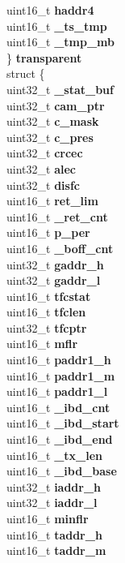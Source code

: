 \begin{DoxyCompactItemize}
\begin{tabbing}
\>\>uint16\_t {\bfseries haddr4}\\
\>\>uint16\_t {\bfseries \_ts\_tmp}\\
\>\>uint16\_t {\bfseries \_tmp\_mb}\\
\>\} {\bfseries transparent}\\
\>struct \{\\
\>\>uint32\_t {\bfseries \_stat\_buf}\\
\>\>uint32\_t {\bfseries cam\_ptr}\\
\>\>uint32\_t {\bfseries c\_mask}\\
\>\>uint32\_t {\bfseries c\_pres}\\
\>\>uint32\_t {\bfseries crcec}\\
\>\>uint32\_t {\bfseries alec}\\
\>\>uint32\_t {\bfseries disfc}\\
\>\>uint16\_t {\bfseries ret\_lim}\\
\>\>uint16\_t {\bfseries \_ret\_cnt}\\
\>\>uint16\_t {\bfseries p\_per}\\
\>\>uint16\_t {\bfseries \_boff\_cnt}\\
\>\>uint32\_t {\bfseries gaddr\_h}\\
\>\>uint32\_t {\bfseries gaddr\_l}\\
\>\>uint16\_t {\bfseries tfcstat}\\
\>\>uint16\_t {\bfseries tfclen}\\
\>\>uint32\_t {\bfseries tfcptr}\\
\>\>uint16\_t {\bfseries mflr}\\
\>\>uint16\_t {\bfseries paddr1\_h}\\
\>\>uint16\_t {\bfseries paddr1\_m}\\
\>\>uint16\_t {\bfseries paddr1\_l}\\
\>\>uint16\_t {\bfseries \_ibd\_cnt}\\
\>\>uint16\_t {\bfseries \_ibd\_start}\\
\>\>uint16\_t {\bfseries \_ibd\_end}\\
\>\>uint16\_t {\bfseries \_tx\_len}\\
\>\>uint16\_t {\bfseries \_ibd\_base}\\
\>\>uint32\_t {\bfseries iaddr\_h}\\
\>\>uint32\_t {\bfseries iaddr\_l}\\
\>\>uint16\_t {\bfseries minflr}\\
\>\>uint16\_t {\bfseries taddr\_h}\\
\>\>uint16\_t {\bfseries taddr\_m}\\

\end{tabbing}
\end{DoxyCompactItemize}
